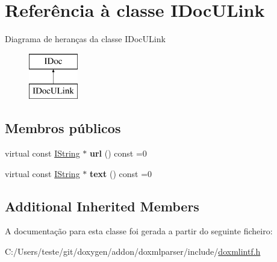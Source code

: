 \hypertarget{class_i_doc_u_link}{\section{Referência à classe I\-Doc\-U\-Link}
\label{class_i_doc_u_link}
}
Diagrama de heranças da classe I\-Doc\-U\-Link\begin{figure}[H]
\begin{center}
\leavevmode
\includegraphics[height=2.000000cm]{class_i_doc_u_link}
\end{center}
\end{figure}
\subsection*{Membros públicos}
\begin{DoxyCompactItemize}
\item 
\hypertarget{class_i_doc_u_link_a0ae902996e9b5ad702147ebe3308e991}{virtual const \hyperlink{class_i_string}{I\-String} $\ast$ {\bfseries url} () const =0}\label{class_i_doc_u_link_a0ae902996e9b5ad702147ebe3308e991}

\item 
\hypertarget{class_i_doc_u_link_aa487ae4b2bd6e3e7975ff2efe2666148}{virtual const \hyperlink{class_i_string}{I\-String} $\ast$ {\bfseries text} () const =0}\label{class_i_doc_u_link_aa487ae4b2bd6e3e7975ff2efe2666148}

\end{DoxyCompactItemize}
\subsection*{Additional Inherited Members}


A documentação para esta classe foi gerada a partir do seguinte ficheiro\-:\begin{DoxyCompactItemize}
\item 
C\-:/\-Users/teste/git/doxygen/addon/doxmlparser/include/\hyperlink{include_2doxmlintf_8h}{doxmlintf.\-h}\end{DoxyCompactItemize}
